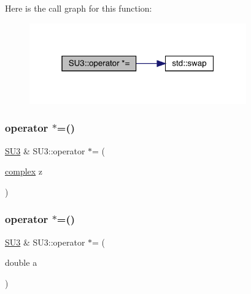 Here is the call graph for this function\+:\nopagebreak
\begin{figure}[H]
\begin{center}
\leavevmode
\includegraphics[width=265pt]{class_s_u3_a499ee2a922f1568eee9fe2e04d8cbe89_cgraph}
\end{center}
\end{figure}
\mbox{\label{class_s_u3_ad1b4ea5706f0d1764c7a9516255a74e4}} 
\subsubsection{\texorpdfstring{operator $\ast$=()}{operator *=()}\hspace{0.1cm}{\footnotesize\ttfamily [2/3]}}
{\footnotesize\ttfamily \mbox{\hyperlink{class_s_u3}{S\+U3}} \& S\+U3\+::operator $\ast$= (\begin{DoxyParamCaption}\item[{\mbox{\hyperlink{classcomplex}{complex}}}]{z }\end{DoxyParamCaption})\hspace{0.3cm}{\ttfamily [inline]}}

\mbox{\label{class_s_u3_aa339fae3b75bd58fac445d38c68582d7}} 
\subsubsection{\texorpdfstring{operator $\ast$=()}{operator *=()}\hspace{0.1cm}{\footnotesize\ttfamily [3/3]}}
{\footnotesize\ttfamily \mbox{\hyperlink{class_s_u3}{S\+U3}} \& S\+U3\+::operator $\ast$= (\begin{DoxyParamCaption}\item[{double}]{a }\end{DoxyParamCaption})\hspace{0.3cm}{\ttfamily [inline]}}

